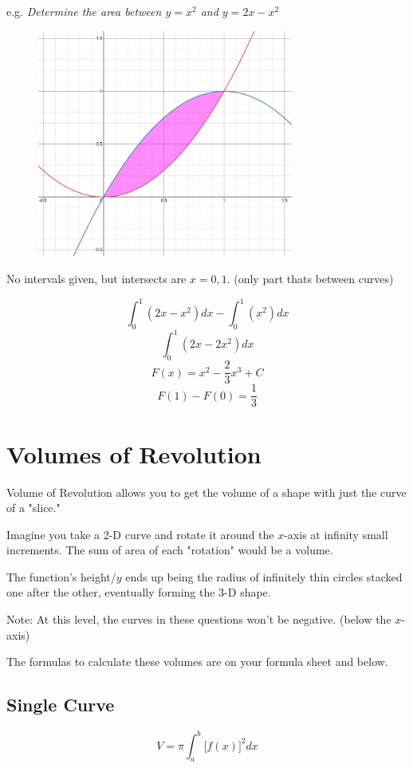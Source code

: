 \documentclass[a4paper,12pt]{article}
\begin{document}
e.g. \emph{Determine the area between $y = x^2$ and $y = 2x - x^2$}
\begin{figure}[H]
    \centering
    \includegraphics[width=0.75\textwidth]{between2}
\end{figure}
No intervals given, but intersects are $x = 0, 1$. (only part thats between curves)

$$\int^1_0{(2x - x^2)}dx - \int^1_0{(x^2)}dx$$
$$\int^1_0{(2x - 2x^2)}dx$$
$$F(x) = x^2 - \frac{2}{3}x^3 + C$$
$$F(1) - F(0) = \frac{1}{3}$$

\pagebreak

\section{Volumes of Revolution}
Volume of Revolution allows you to get the volume of a shape with just the curve of a "slice."

Imagine you take a 2-D curve and rotate it around the $x$-axis at infinity small increments. The sum of area of each "rotation" would be a volume.

The function's height/$y$ ends up being the radius of infinitely thin circles stacked one after the other, eventually forming the 3-D shape.

Note: At this level, the curves in these questions won't be negative. (below the $x$-axis)

The formulas to calculate these volumes are on your formula sheet and below.

\subsection{Single Curve}
\Large
$$V = \pi\int^b_a{\Big[f(x)\Big]^2}dx$$
\normalsize
\end{document}
